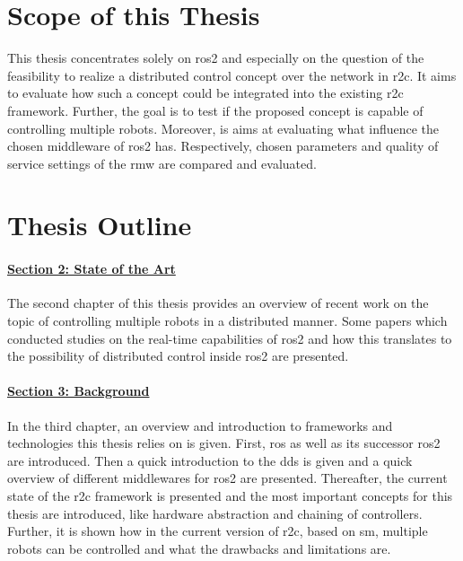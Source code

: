 \section{Scope of this Thesis}
This thesis concentrates solely on \gls{ros2} and especially on the question of the feasibility to realize a distributed control concept over the network in \gls{r2c}. It aims to evaluate how such a concept could be integrated into the existing \gls{r2c} framework. Further, the goal is to test if the proposed concept is capable of controlling multiple robots. Moreover, is aims at evaluating what influence the chosen middleware of \gls{ros2} has. Respectively, chosen parameters and quality of service settings of the \gls{rmw} are compared and evaluated.


\section{Thesis Outline}
\paragraph{\hyperref[sec:state_of_the_art]{Section 2: State of the Art}}
The second chapter of this thesis provides an overview of recent work on the topic of controlling multiple robots in a distributed manner. Some papers which conducted studies on the real-time capabilities of \gls{ros2} and how this translates to the possibility of distributed control inside \gls{ros2} are presented.

\paragraph{\hyperref[sec:background]{Section 3: Background}}
In the third chapter, an overview and introduction to frameworks and technologies this thesis relies on is given. First, \gls{ros} as well as its successor \gls{ros2} are introduced. Then a quick introduction to the \acrlong{dds} is given and a quick overview of different middlewares for \gls{ros2} are presented. Thereafter, the current state of the \gls{r2c} framework is presented and the most important concepts for this thesis are introduced, like hardware abstraction and chaining of controllers. Further, it is shown how in the current version of \gls{r2c}, based on \acrlong{sm}, multiple robots can be controlled and what the drawbacks and limitations are.

